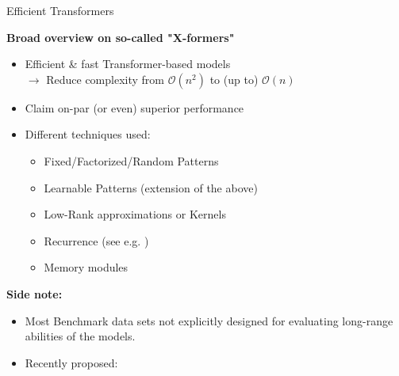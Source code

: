 \begin{frame}{Efficient Transformers}

\vfill

\textbf{Broad overview on so-called "X-formers" \href{https://arxiv.org/pdf/2009.06732.pdf}{}}

\begin{itemize}
	\item Efficient \& fast Transformer-based models\\
				$\rightarrow$ Reduce complexity from $\mathcal{O}(n^2)$ to (up to) $\mathcal{O}(n)$
	\item Claim on-par (or even) superior performance
	\item Different techniques used:
				\begin{itemize}
					\item Fixed/Factorized/Random Patterns
					\item Learnable Patterns (extension of the above)
					\item Low-Rank approximations or Kernels
					\item Recurrence (see e.g. \href{https://arxiv.org/pdf/1901.02860.pdf}{})
					\item Memory modules
				\end{itemize}
\end{itemize}
	
	\vspace{.3cm}
	
\textbf{Side note:}

\begin{itemize}
	\item Most Benchmark data sets not explicitly designed for evaluating long-range abilities of the models.
	\item Recently proposed: \href{https://arxiv.org/pdf/2011.04006.pdf}{}
\end{itemize}
	
\vfill

\end{frame}


